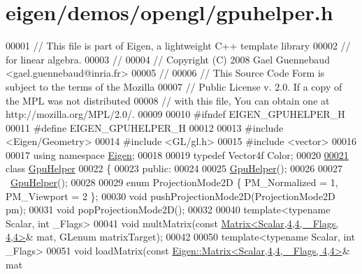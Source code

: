 \hypertarget{eigen_2demos_2opengl_2gpuhelper_8h_source}{}\section{eigen/demos/opengl/gpuhelper.h}
\label{eigen_2demos_2opengl_2gpuhelper_8h_source}

\begin{DoxyCode}
00001 \textcolor{comment}{// This file is part of Eigen, a lightweight C++ template library}
00002 \textcolor{comment}{// for linear algebra.}
00003 \textcolor{comment}{//}
00004 \textcolor{comment}{// Copyright (C) 2008 Gael Guennebaud <gael.guennebaud@inria.fr>}
00005 \textcolor{comment}{//}
00006 \textcolor{comment}{// This Source Code Form is subject to the terms of the Mozilla}
00007 \textcolor{comment}{// Public License v. 2.0. If a copy of the MPL was not distributed}
00008 \textcolor{comment}{// with this file, You can obtain one at http://mozilla.org/MPL/2.0/.}
00009 
00010 \textcolor{preprocessor}{#ifndef EIGEN\_GPUHELPER\_H}
00011 \textcolor{preprocessor}{#define EIGEN\_GPUHELPER\_H}
00012 
00013 \textcolor{preprocessor}{#include <Eigen/Geometry>}
00014 \textcolor{preprocessor}{#include <GL/gl.h>}
00015 \textcolor{preprocessor}{#include <vector>}
00016 
00017 \textcolor{keyword}{using namespace }\hyperlink{namespace_eigen}{Eigen};
00018 
00019 \textcolor{keyword}{typedef} Vector4f Color;
00020 
\hyperlink{class_gpu_helper}{00021} \textcolor{keyword}{class }\hyperlink{class_gpu_helper}{GpuHelper}
00022 \{
00023   \textcolor{keyword}{public}:
00024 
00025     \hyperlink{class_gpu_helper}{GpuHelper}();
00026 
00027     ~\hyperlink{class_gpu_helper}{GpuHelper}();
00028 
00029     \textcolor{keyword}{enum} ProjectionMode2D \{ PM\_Normalized = 1, PM\_Viewport = 2 \};
00030     \textcolor{keywordtype}{void} pushProjectionMode2D(ProjectionMode2D pm);
00031     \textcolor{keywordtype}{void} popProjectionMode2D();
00032 
00040     \textcolor{keyword}{template}<\textcolor{keyword}{typename} Scalar, \textcolor{keywordtype}{int} \_Flags>
00041     \textcolor{keywordtype}{void} multMatrix(\textcolor{keyword}{const} \hyperlink{group___core___module_class_eigen_1_1_matrix}{Matrix<Scalar,4,4, \_Flags, 4,4>}& mat, GLenum 
      matrixTarget);
00042 
00050     \textcolor{keyword}{template}<\textcolor{keyword}{typename} Scalar, \textcolor{keywordtype}{int} \_Flags>
00051     \textcolor{keywordtype}{void} loadMatrix(\textcolor{keyword}{const} \hyperlink{group___core___module_class_eigen_1_1_matrix}{Eigen::Matrix<Scalar,4,4, \_Flags, 4,4>}& mat

\end{DoxyCode}

